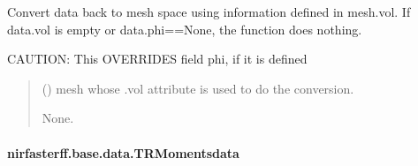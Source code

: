 \documentclass[letterpaper,10pt,english]{sphinxmanual}
\begin{document}
\begin{fulllineitems}
\begin{fulllineitems}
\label{\detokenize{_autosummary/nirfasterff.base.data.TPSFdata:nirfasterff.base.data.TPSFdata.tomesh}}
\pysigstartsignatures
{}
\pysigstopsignatures
\sphinxAtStartPar
Convert data back to mesh space using information defined in mesh.vol. If data.vol is empty or data.phi==None, the function does nothing.

\sphinxAtStartPar
CAUTION: This OVERRIDES field phi, if it is defined
\begin{quote}\begin{description}
\sphinxAtStartPar
{} () \textendash{} mesh whose .vol attribute is used to do the conversion.

\sphinxAtStartPar
None.

\end{description}\end{quote}

\end{fulllineitems}


\end{fulllineitems}


\sphinxstepscope


\paragraph{nirfasterff.base.data.TRMomentsdata}
\label{\detokenize{_autosummary/nirfasterff.base.data.TRMomentsdata:nirfasterff-base-data-trmomentsdata}}\label{\detokenize{_autosummary/nirfasterff.base.data.TRMomentsdata::doc}}
\end{document}
